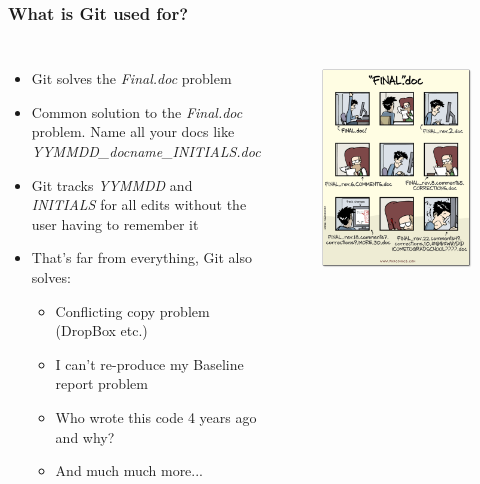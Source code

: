 \documentclass[aspectratio=169]{beamer} %
\begin{document}
\begin{frame}
\frametitle{What is Git used for?}

	\begin{columns}[c] 
		
		\begin{itemize}
			\item Git solves the \textit{Final.doc} problem
			\item <2->Common solution to the \textit{Final.doc} problem. Name all your docs like \textit{YYMMDD\_docname\_INITIALS.doc}
			\item <3->Git tracks \textit{YYMMDD} and \textit{INITIALS} for all edits  without the user having to remember it
			\item <4->That's far from everything, Git also solves:
			\begin{itemize}
				\item <4->Conflicting copy problem (DropBox etc.)
				\item <4->I can't re-produce my Baseline report problem
				\item <4->Who wrote this code 4 years ago and why?
				\item <4->And much much more...
			\end{itemize} 
		\end{itemize}	
		
		\begin{figure}
			\centering
			\includegraphics[width=1\linewidth]{../../Common-Resources/img/finaldoc_cartoon}
			\label{fig:finaldoccartoon}
		\end{figure}
		

\end{columns}
\end{frame}
\end{document}
